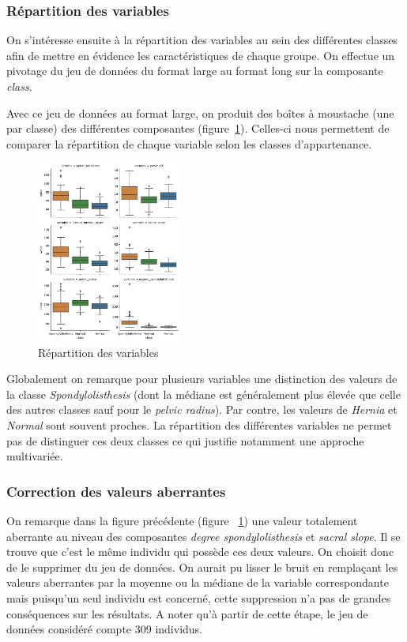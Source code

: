 \documentclass[twocolumn,10pt]{article}
\begin{document}
\subsubsection{Répartition des variables}

On s'intéresse ensuite à la répartition des variables au sein des différentes classes afin de mettre en évidence les caractéristiques de chaque groupe. On effectue un pivotage du jeu de données du format large au format long sur la composante \textit{class}.

Avec ce jeu de données au format large, on produit des boîtes à moustache (une par classe) des différentes composantes (figure~\ref{fig:boxplot_variables}). Celles-ci nous permettent de comparer la répartition de chaque variable selon les classes d'appartenance.

\begin{figure}[htbp]
    \begin{center}
    \includegraphics[width=0.425\textwidth]{figures/boxplot_variables.png}
    \caption{\label{fig:boxplot_variables}Répartition des variables}
    \end{center}
\end{figure}

Globalement on remarque pour plusieurs variables une distinction des valeurs de la classe \textit{Spondylolisthesis} (dont la médiane est généralement plus élevée que celle des autres classes sauf pour le \textit{pelvic radius}).
Par contre, les valeurs de \textit{Hernia} et \textit{Normal} sont souvent proches. La répartition des différentes variables ne permet pas de distinguer ces deux classes ce qui justifie notamment une approche multivariée.

\subsubsection{Correction des valeurs aberrantes}
On remarque dans la figure précédente (figure ~\ref{fig:boxplot_variables}) une valeur totalement aberrante au niveau des composantes \textit{degree spondylolisthesis} et \textit{sacral slope}. Il se trouve que c'est le même individu qui possède ces deux valeurs. On choisit donc de le supprimer du jeu de données. On aurait pu lisser le bruit en remplaçant les valeurs aberrantes par la moyenne ou la médiane de la variable correspondante mais puisqu'un seul individu est concerné, cette suppression n'a pas de grandes conséquences sur les résultats. A noter qu'à partir de cette étape, le jeu de données considéré compte 309 individus.
\end{document}
